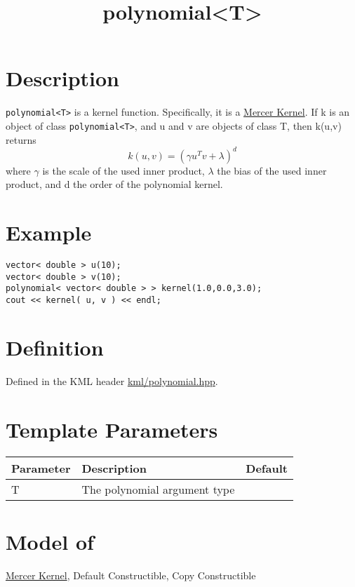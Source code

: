 \documentclass{article}
\begin{document}
\title{polynomial<T>}
\maketitle

\section*{Description}

\texttt{polynomial<T>} is a kernel function. Specifically, it is a \href{\kmlroot/mercer_kernel.html}{Mercer Kernel}.
 If k is an object of class \texttt{polynomial<T>}, and u and v are objects of class T, then k(u,v) returns
%
$$k(u,v) = (\gamma u^T v + \lambda)^d$$
%
where $\gamma$ is the scale of the used inner product, $\lambda$ the bias of the used inner product, and d the order of the polynomial kernel.


\section*{Example}


\highlightcpp{}
\begin{verbatim}
vector< double > u(10);
vector< double > v(10);
polynomial< vector< double > > kernel(1.0,0.0,3.0);
cout << kernel( u, v ) << endl;
\end{verbatim}


\section*{Definition}

Defined in the KML header \href{\kmlsvnroot/kml/polynomial.hpp}{kml/polynomial.hpp}.


\section*{Template Parameters}

\begin{tabular}{lll}
\textbf{Parameter} & \textbf{Description} & \textbf{Default} \\ 
\hline
T & The polynomial argument type \\ 
\end{tabular}


\section*{Model of}

\href{\kmlroot/mercer_kernel.html}{Mercer Kernel}, 
Default Constructible, Copy Constructible
\end{document}
